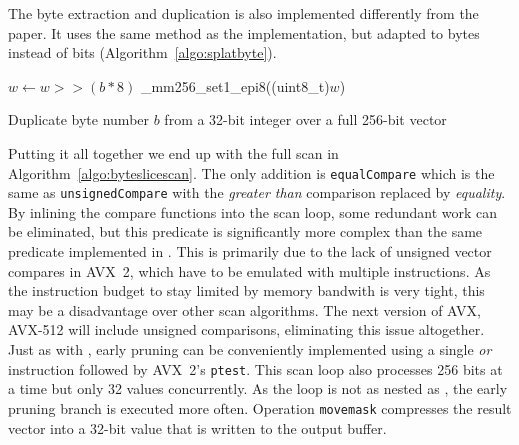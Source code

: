 The byte extraction and duplication is also implemented differently from the
paper. It uses the same method as the \bwv{} implementation, but adapted to bytes
instead of bits (Algorithm~\ref{algo:splatbyte}).

\begin{algorithm}[h]
\begin{algorithmic}[1]
  \State $w \gets w >> (b * 8)$ 
  \State \Return \_mm256\_set1\_epi8((uint8\_t)$w$) 
  \EndProcedure
\end{algorithmic}
\caption{Duplicate byte number $b$ from a 32-bit integer over a full 256-bit vector}
\label{algo:splatbyte}
\end{algorithm}

Putting it all together we end up with the full scan in
Algorithm~\ref{algo:byteslicescan}. The only addition is \texttt{equalCompare}
which is the same as \texttt{unsignedCompare} with the \emph{greater than}
comparison replaced by \emph{equality}. By inlining the compare functions into
the scan loop, some redundant work can be eliminated, but this predicate is
significantly more complex than the same predicate implemented in \bwv{}. This
is primarily due to the lack of unsigned vector compares in AVX~2, which have to
be emulated with multiple instructions. As the instruction budget to stay
limited by memory bandwith is very tight, this may be a disadvantage over other
scan algorithms.  The next version of AVX, AVX-512 will include unsigned
comparisons, eliminating this issue altogether. Just as with \bwv{}, early
pruning can be conveniently implemented using a single \emph{or} instruction
followed by AVX~2's \texttt{ptest}.  This scan loop also processes 256 bits at a
time but only 32 values concurrently. As the loop is not as nested as \bwv{},
the early pruning branch is executed more often. Operation \texttt{movemask}
compresses the result vector into a 32-bit value that is written to the output
buffer.

